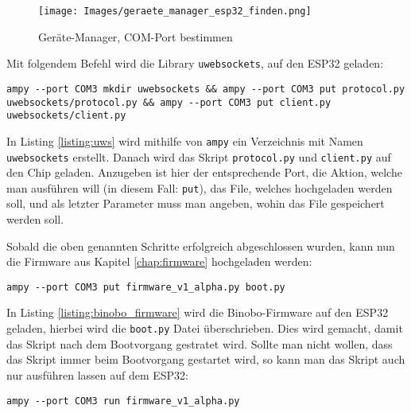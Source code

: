 \documentclass[paper=a4,12pt]{scrreprt}
\begin{document}
\begin{figure}[H]
  \centering
  \texttt{[image: Images/geraete\_manager\_esp32\_finden.png]}
  \caption{Geräte-Manager, COM-Port bestimmen}
\end{figure}



Mit folgendem Befehl wird die Library \texttt{uwebsockets}, auf den ESP32 geladen:\newline

\begin{lstlisting}[caption={Flashen der \texttt{uwebsockets}-Library}, captionpos=b, label={listing:uws}]
ampy --port COM3 mkdir uwebsockets && ampy --port COM3 put protocol.py uwebsockets/protocol.py && ampy --port COM3 put client.py uwebsockets/client.py
\end{lstlisting}

In Listing \ref{listing:uws} wird mithilfe von \texttt{ampy} ein Verzeichnis mit Namen \texttt{uwebsockets} erstellt. Danach wird das Skript \texttt{protocol.py} und \texttt{client.py} auf den Chip geladen. Anzugeben ist hier der entsprechende Port, die Aktion, welche man ausführen will (in diesem Fall: \texttt{put}), das File, welches hochgeladen werden soll, und als letzter Parameter muss man angeben, wohin das File gespeichert werden soll.\newline

Sobald die oben genannten Schritte erfolgreich abgeschlossen wurden, kann nun die Firmware aus Kapitel \ref{chap:firmware} hochgeladen werden:\newline

\begin{lstlisting}[caption={Flashen der Binobo-Firmware}, captionpos=b, label={listing:binobo_firmware}]
ampy --port COM3 put firmware_v1_alpha.py boot.py
\end{lstlisting}

In Listing \ref{listing:binobo_firmware} wird die Binobo-Firmware auf den ESP32 geladen, hierbei wird die \texttt{boot.py} Datei überschrieben. Dies wird gemacht, damit das Skript nach dem Bootvorgang gestratet wird.\newline
Sollte man nicht wollen, dass das Skript immer beim Bootvorgang gestartet wird, so kann man das Skript auch nur ausführen lassen auf dem ESP32:\newline

\begin{lstlisting}[caption={Starten der Binobo-Firmware ohne Flashen}, captionpos=b, label={listing:binobo_firmware_start}]
  ampy --port COM3 run firmware_v1_alpha.py
\end{lstlisting}
\end{document}
